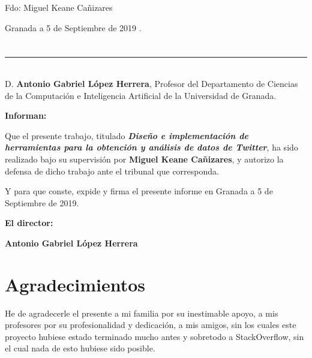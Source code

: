 \vspace{6cm}

\noindent Fdo: Miguel Keane Cañizares

\vspace{2cm}

\begin{flushright}
Granada a 5 de Septiembre de 2019 .
\end{flushright}


\chapter*{}
\thispagestyle{empty}

\noindent\rule[-1ex]{\textwidth}{2pt}\\[4.5ex]

D. \textbf{Antonio Gabriel López Herrera}, Profesor del Departamento de Ciencias de la Computación e Inteligencia Artificial de la Universidad de Granada.

\vspace{0.5cm}



\vspace{0.5cm}

\textbf{Informan:}

\vspace{0.5cm}

Que el presente trabajo, titulado \textit{\textbf{Diseño e implementación de herramientas para la obtención y análisis de datos de Twitter}},
ha sido realizado bajo su supervisión por \textbf{Miguel Keane Cañizares}, y autorizo la defensa de dicho trabajo ante el tribunal
que corresponda.

\vspace{0.5cm}

Y para que conste, expide y firma el presente informe en Granada a 5 de Septiembre de 2019.

\vspace{1cm}

\textbf{El director:}

\vspace{5cm}

\noindent \textbf{Antonio Gabriel López Herrera }%

\chapter*{Agradecimientos}
\thispagestyle{empty}

       \vspace{1cm}


He de agradecerle el presente a mi familia por su inestimable apoyo, a mis profesores por su profesionalidad y dedicación, a mis amigos, sin los cuales este proyecto hubiese estado terminado mucho antes y sobretodo a StackOverflow, sin el cual nada de esto hubiese sido posible. 

